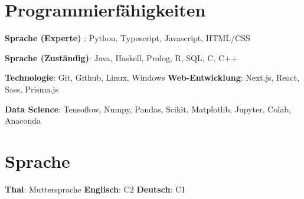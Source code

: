 %
\section{Programmierfähigkeiten}
\resumeSubHeadingListStart
\item{
            \textbf{Sprache (Experte) }{: Python, Typescript, Javascript, HTML/CSS}
      }
\item{
            \textbf{Sprache (Zuständig)}{: Java, Haskell, Prolog, R, SQL, C, C++}
      }
\item{
            \textbf{Technologie}{: Git, Github, Linux, Windows}
            \hfill
            \textbf{Web-Entwicklung}{: Next.js, React, Sass, Prisma.js}
      }
\item{
            \textbf{Data Science}{: Tensoflow, Numpy, Pandas, Scikit, Matplotlib, Jupyter, Colab, Anaconda}
            \hfill
      }
\resumeSubHeadingListEnd
%
\section{Sprache}
\resumeSubHeadingListStart
\item{
            \textbf{Thai}{: Muttersprache}
            \hfill
            \textbf{Englisch}{: C2}
            \hfill
            \textbf{Deutsch}{: C1}
      }
\resumeSubHeadingListEnd